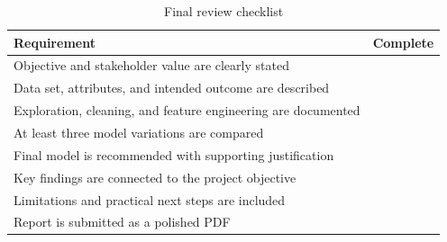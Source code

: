 \documentclass[11pt,letterpaper]{article}
\newcommand{\checkmarkbox}{\fbox{\rule{0pt}{0.9ex}\rule{0.9ex}{0pt}}}
\begin{document}
\begin{table}[htbp]
  \centering
  \caption{Final review checklist}
  \label{tab:checklist}
  \begin{tabular}{@{}p{}p{}@{}}
    \hline
    \textbf{Requirement} & \textbf{Complete}\\
    \hline
    Objective and stakeholder value are clearly stated & \checkmarkbox\\
    Data set, attributes, and intended outcome are described & \checkmarkbox\\
    Exploration, cleaning, and feature engineering are documented & \checkmarkbox\\
    At least three model variations are compared & \checkmarkbox\\
    Final model is recommended with supporting justification & \checkmarkbox\\
    Key findings are connected to the project objective & \checkmarkbox\\
    Limitations and practical next steps are included & \checkmarkbox\\
    Report is submitted as a polished PDF & \checkmarkbox\\
    \hline
  \end{tabular}
\end{table}
\end{document}
